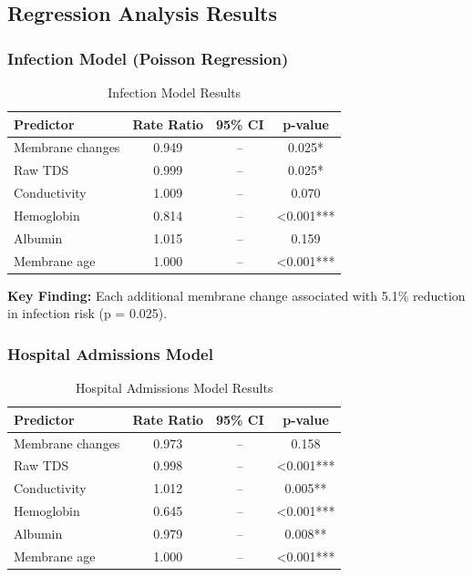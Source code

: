 \documentclass[11pt,a4paper]{article}
\begin{document}
\subsection{Regression Analysis Results}

\subsubsection{Infection Model (Poisson Regression)}

\begin{table}[H]
\centering
\caption{Infection Model Results}
\begin{tabular}{@{}lccc@{}}
\toprule
\textbf{Predictor} & \textbf{Rate Ratio} & \textbf{95\% CI} & \textbf{p-value} \\
\midrule
Membrane changes & 0.949 & -- & 0.025* \\
Raw TDS & 0.999 & -- & 0.025* \\
Conductivity & 1.009 & -- & 0.070 \\
Hemoglobin & 0.814 & -- & <0.001*** \\
Albumin & 1.015 & -- & 0.159 \\
Membrane age & 1.000 & -- & <0.001*** \\
\bottomrule
\end{tabular}
\label{tab:infection}
\end{table}

\textbf{Key Finding:} Each additional membrane change associated with 5.1\% reduction in infection risk (p = 0.025).

\subsubsection{Hospital Admissions Model}

\begin{table}[H]
\centering
\caption{Hospital Admissions Model Results}
\begin{tabular}{@{}lccc@{}}
\toprule
\textbf{Predictor} & \textbf{Rate Ratio} & \textbf{95\% CI} & \textbf{p-value} \\
\midrule
Membrane changes & 0.973 & -- & 0.158 \\
Raw TDS & 0.998 & -- & <0.001*** \\
Conductivity & 1.012 & -- & 0.005** \\
Hemoglobin & 0.645 & -- & <0.001*** \\
Albumin & 0.979 & -- & 0.008** \\
Membrane age & 1.000 & -- & <0.001*** \\
\bottomrule
\end{tabular}
\label{tab:admissions}
\end{table}
\end{document}
